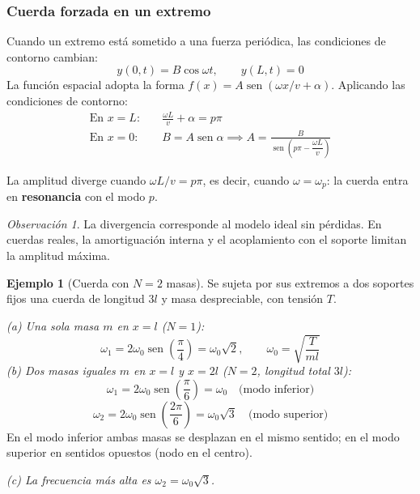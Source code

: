 \documentclass[12pt, a4paper]{article}
\theoremstyle{plain}
\theoremstyle{definition}
\newtheorem{ejemplo}{Ejemplo}[section]
\theoremstyle{remark}
\newtheorem*{observacion}{Observación}
\DeclareMathOperator{\sen}{sen}
\begin{document}
\subsubsection{Cuerda forzada en un extremo}

Cuando un extremo está sometido a una fuerza periódica, las condiciones de contorno
cambian:
\begin{equation}
  y(0,t) = B\cos\omega t,\qquad y(L,t) = 0
\end{equation}
La función espacial adopta la forma $f(x) = A\sen(\omega x/v + \alpha)$. Aplicando las
condiciones de contorno:
\begin{align}
  \text{En }x=L:&\quad \frac{\omega L}{v} + \alpha = p\pi \\
  \text{En }x=0:&\quad B = A\sen\alpha \implies
    A = \frac{B}{\sen\!\left(p\pi - \dfrac{\omega L}{v}\right)}
\end{align}

La amplitud diverge cuando $\omega L/v = p\pi$, es decir, cuando $\omega = \omega_p$:
la cuerda entra en \textbf{resonancia} con el modo $p$.
\begin{observacion}
La divergencia corresponde al modelo ideal sin pérdidas. En cuerdas reales, la
amortiguación interna y el acoplamiento con el soporte limitan la amplitud máxima.
\end{observacion}

\begin{ejemplo}[Cuerda con \texorpdfstring{$N=2$}{N=2} masas]
Se sujeta por sus extremos a dos soportes fijos una cuerda de longitud $3l$ y masa
despreciable, con tensión $T$.

\textit{(a) Una sola masa $m$ en $x=l$ ($N=1$):}
\begin{equation}
  \omega_1 = 2\omega_0\sen\!\left(\frac{\pi}{4}\right) = \omega_0\sqrt{2},
  \qquad \omega_0 = \sqrt{\frac{T}{ml}}
\end{equation}
\textit{(b) Dos masas iguales $m$ en $x=l$ y $x=2l$ ($N=2$, longitud total $3l$):}
\begin{equation}
  \omega_1 = 2\omega_0\sen\!\left(\frac{\pi}{6}\right) = \omega_0
  \quad\text{(modo inferior)}
\end{equation}
\begin{equation}
  \omega_2 = 2\omega_0\sen\!\left(\frac{2\pi}{6}\right) = \omega_0\sqrt{3}
  \quad\text{(modo superior)}
\end{equation}
En el modo inferior ambas masas se desplazan en el mismo sentido; en el modo superior en
sentidos opuestos (nodo en el centro).

\textit{(c) La frecuencia más alta es $\omega_2 = \omega_0\sqrt{3}$.}
\end{ejemplo}
\end{document}
